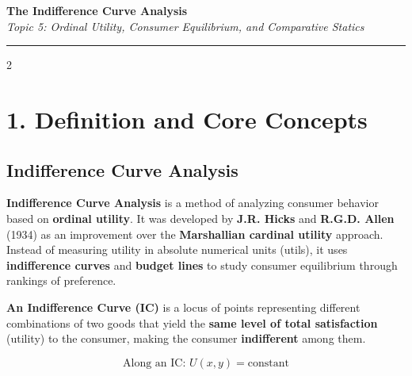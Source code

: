 \documentclass[10pt,a4paper]{article}
\begin{document}
\begin{center}
{\LARGE \textbf{The Indifference Curve Analysis}}\\[0.15cm]
{\normalsize \textit{Topic 5: Ordinal Utility, Consumer Equilibrium, and Comparative Statics}}\\[0.15cm]
\hrule
\end{center}
\vspace{-0.3cm}

\begin{multicols}{2}
\footnotesize

\section*{1. Definition and Core Concepts}

\subsection*{Indifference Curve Analysis}
\textbf{Indifference Curve Analysis} is a method of analyzing consumer behavior based on \textbf{ordinal utility}. It was developed by \textbf{J.R. Hicks} and \textbf{R.G.D. Allen} (1934) as an improvement over the \textbf{Marshallian cardinal utility} approach. Instead of measuring utility in absolute numerical units (utils), it uses \textbf{indifference curves} and \textbf{budget lines} to study consumer equilibrium through rankings of preference.

\textbf{An Indifference Curve (IC)} is a locus of points representing different combinations of two goods that yield the \textbf{same level of total satisfaction} (utility) to the consumer, making the consumer \textbf{indifferent} among them.

\[
\text{Along an IC: } U(x, y) = \text{constant}
\]


\end{multicols}
\end{document}
